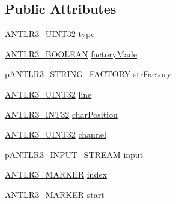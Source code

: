 \subsection*{Public Attributes}
\begin{DoxyCompactItemize}
\item 
\hyperlink{antlr3defs_8h_ac41f744abd0fd25144b9eb9d11b1dfd1}{A\-N\-T\-L\-R3\-\_\-\-U\-I\-N\-T32} \hyperlink{struct_a_n_t_l_r3___c_o_m_m_o_n___t_o_k_e_n__struct_a8c4bd5b1374d3b483d286de8cd68de23}{type}
\item 
\hyperlink{antlr3defs_8h_a5b33dccbba3b7212539695e21df4079b}{A\-N\-T\-L\-R3\-\_\-\-B\-O\-O\-L\-E\-A\-N} \hyperlink{struct_a_n_t_l_r3___c_o_m_m_o_n___t_o_k_e_n__struct_a8464f5dc1b758f4cae8c0b20881106e7}{factory\-Made}
\item 
\hyperlink{antlr3interfaces_8h_a499a87287d582de04cf736f342b20692}{p\-A\-N\-T\-L\-R3\-\_\-\-S\-T\-R\-I\-N\-G\-\_\-\-F\-A\-C\-T\-O\-R\-Y} \hyperlink{struct_a_n_t_l_r3___c_o_m_m_o_n___t_o_k_e_n__struct_a1d384f2213411e3a2d607ad357131e92}{str\-Factory}
\item 
\hyperlink{antlr3defs_8h_ac41f744abd0fd25144b9eb9d11b1dfd1}{A\-N\-T\-L\-R3\-\_\-\-U\-I\-N\-T32} \hyperlink{struct_a_n_t_l_r3___c_o_m_m_o_n___t_o_k_e_n__struct_aa4541ade0791f2ef3b48004bb4e17ac8}{line}
\item 
\hyperlink{antlr3defs_8h_a6faef5c4687f8eb633d2aefea93973ca}{A\-N\-T\-L\-R3\-\_\-\-I\-N\-T32} \hyperlink{struct_a_n_t_l_r3___c_o_m_m_o_n___t_o_k_e_n__struct_acac91fe953476fe8e439db81194f8195}{char\-Position}
\item 
\hyperlink{antlr3defs_8h_ac41f744abd0fd25144b9eb9d11b1dfd1}{A\-N\-T\-L\-R3\-\_\-\-U\-I\-N\-T32} \hyperlink{struct_a_n_t_l_r3___c_o_m_m_o_n___t_o_k_e_n__struct_af961ed91f161792bf4c6a621d3d8c097}{channel}
\item 
\hyperlink{antlr3interfaces_8h_a30a8f71f3e04066360723d538fd67f16}{p\-A\-N\-T\-L\-R3\-\_\-\-I\-N\-P\-U\-T\-\_\-\-S\-T\-R\-E\-A\-M} \hyperlink{struct_a_n_t_l_r3___c_o_m_m_o_n___t_o_k_e_n__struct_a8e4b164d9d042904977ab10b724d9679}{input}
\item 
\hyperlink{antlr3defs_8h_a0361e6bf442e07afe923e4d05e9ebc4f}{A\-N\-T\-L\-R3\-\_\-\-M\-A\-R\-K\-E\-R} \hyperlink{struct_a_n_t_l_r3___c_o_m_m_o_n___t_o_k_e_n__struct_aa4e14f542df2d0c11835264d7bd8afe3}{index}
\item 
\hyperlink{antlr3defs_8h_a0361e6bf442e07afe923e4d05e9ebc4f}{A\-N\-T\-L\-R3\-\_\-\-M\-A\-R\-K\-E\-R} \hyperlink{struct_a_n_t_l_r3___c_o_m_m_o_n___t_o_k_e_n__struct_a6ffe3fc2cf55c871f461c6022e112f7f}{start}

\end{DoxyCompactItemize}
